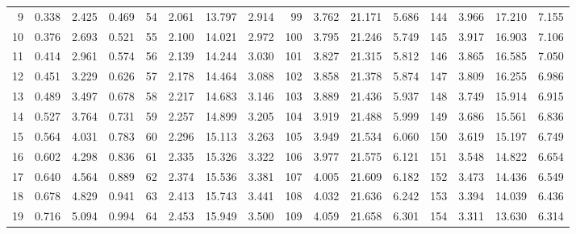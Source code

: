 \begin{table}
{\begin{tabular}{rrrr|rrrr|rrrr|rrrr}
  9 & \tiny{  0.338} &   2.425 & \tiny{  0.469} &  54 & \tiny{  2.061} &  13.797 & \tiny{  2.914} &  99 & \tiny{  3.762} &  21.171 & \tiny{  5.686} & 144 & \tiny{  3.966} &  17.210 & \tiny{  7.155}\\
 10 & \tiny{  0.376} &   2.693 & \tiny{  0.521} &  55 & \tiny{  2.100} &  14.021 & \tiny{  2.972} & 100 & \tiny{  3.795} &  21.246 & \tiny{  5.749} & 145 & \tiny{  3.917} &  16.903 & \tiny{  7.106}\\
 11 & \tiny{  0.414} &   2.961 & \tiny{  0.574} &  56 & \tiny{  2.139} &  14.244 & \tiny{  3.030} & 101 & \tiny{  3.827} &  21.315 & \tiny{  5.812} & 146 & \tiny{  3.865} &  16.585 & \tiny{  7.050}\\
 12 & \tiny{  0.451} &   3.229 & \tiny{  0.626} &  57 & \tiny{  2.178} &  14.464 & \tiny{  3.088} & 102 & \tiny{  3.858} &  21.378 & \tiny{  5.874} & 147 & \tiny{  3.809} &  16.255 & \tiny{  6.986}\\
 13 & \tiny{  0.489} &   3.497 & \tiny{  0.678} &  58 & \tiny{  2.217} &  14.683 & \tiny{  3.146} & 103 & \tiny{  3.889} &  21.436 & \tiny{  5.937} & 148 & \tiny{  3.749} &  15.914 & \tiny{  6.915}\\
 14 & \tiny{  0.527} &   3.764 & \tiny{  0.731} &  59 & \tiny{  2.257} &  14.899 & \tiny{  3.205} & 104 & \tiny{  3.919} &  21.488 & \tiny{  5.999} & 149 & \tiny{  3.686} &  15.561 & \tiny{  6.836}\\
 15 & \tiny{  0.564} &   4.031 & \tiny{  0.783} &  60 & \tiny{  2.296} &  15.113 & \tiny{  3.263} & 105 & \tiny{  3.949} &  21.534 & \tiny{  6.060} & 150 & \tiny{  3.619} &  15.197 & \tiny{  6.749}\\
 16 & \tiny{  0.602} &   4.298 & \tiny{  0.836} &  61 & \tiny{  2.335} &  15.326 & \tiny{  3.322} & 106 & \tiny{  3.977} &  21.575 & \tiny{  6.121} & 151 & \tiny{  3.548} &  14.822 & \tiny{  6.654}\\
 17 & \tiny{  0.640} &   4.564 & \tiny{  0.889} &  62 & \tiny{  2.374} &  15.536 & \tiny{  3.381} & 107 & \tiny{  4.005} &  21.609 & \tiny{  6.182} & 152 & \tiny{  3.473} &  14.436 & \tiny{  6.549}\\
 18 & \tiny{  0.678} &   4.829 & \tiny{  0.941} &  63 & \tiny{  2.413} &  15.743 & \tiny{  3.441} & 108 & \tiny{  4.032} &  21.636 & \tiny{  6.242} & 153 & \tiny{  3.394} &  14.039 & \tiny{  6.436}\\
 19 & \tiny{  0.716} &   5.094 & \tiny{  0.994} &  64 & \tiny{  2.453} &  15.949 & \tiny{  3.500} & 109 & \tiny{  4.059} &  21.658 & \tiny{  6.301} & 154 & \tiny{  3.311} &  13.630 & \tiny{  6.314}\\

\end{tabular}}
\end{table}
